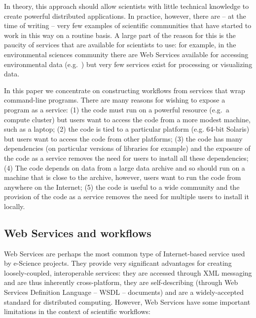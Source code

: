 \documentclass{llncs}
\begin{document}
In theory, this approach should allow scientists with little technical knowledge to create powerful distributed applications.  In practice, however, there are -- at the time of writing -- very few examples of scientific communities that have started to work in this way on a routine basis.  A large part of the reason for this is the paucity of services that are available for scientists to use: for example, in the environmental sciences community there are Web Services available for accessing environmental data (e.g.\ \cite{Woolf:2003}) but very few services exist for processing or visualizing data.

In this paper we concentrate on constructing workflows from services that wrap command-line programs.  There are many reasons for wishing to expose a program as a service: (1) the code must run on a powerful resource (e.g.\ a compute cluster) but users want to access the code from a more modest machine, such as a laptop; (2) the code is tied to a particular platform (e.g. 64-bit Solaris) but users want to access the code from other platforms; (3) the code has many dependencies (on particular versions of libraries for example) and the exposure of the code as a service removes the need for users to install all these dependencies; (4) The code depends on data from a large data archive and so should run on a machine that is close to the archive,  however, users want to run the code from anywhere on the Internet; (5) the code is useful to a wide community and the provision of the code as a service removes the need for multiple users to install it locally.

\subsection{Web Services and workflows}\label{sec:webservices}
Web Services are perhaps the most common type of Internet-based service used by e-Science projects.  They provide very significant advantages for creating loosely-coupled, interoperable services: they are accessed through XML messaging and are thus inherently cross-platform, they are self-describing (through Web Services Definition Language -- WSDL -- documents) and are a widely-accepted standard for distributed computing.  However, Web Services have some important limitations in the context of scientific workflows:
\end{document}
